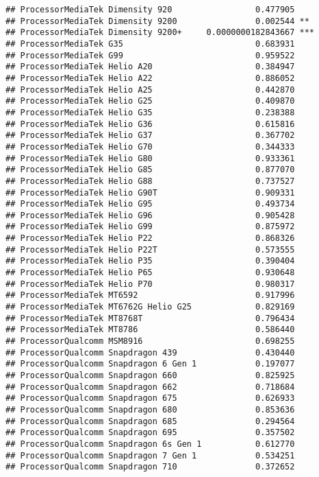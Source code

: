 \documentclass[
]{article}
\begin{document}
\begin{verbatim}
## ProcessorMediaTek Dimensity 920                 0.477905    
## ProcessorMediaTek Dimensity 9200                0.002544 ** 
## ProcessorMediaTek Dimensity 9200+     0.0000000182843667 ***
## ProcessorMediaTek G35                           0.683931    
## ProcessorMediaTek G99                           0.959522    
## ProcessorMediaTek Helio A20                     0.384947    
## ProcessorMediaTek Helio A22                     0.886052    
## ProcessorMediaTek Helio A25                     0.442870    
## ProcessorMediaTek Helio G25                     0.409870    
## ProcessorMediaTek Helio G35                     0.238388    
## ProcessorMediaTek Helio G36                     0.615816    
## ProcessorMediaTek Helio G37                     0.367702    
## ProcessorMediaTek Helio G70                     0.344333    
## ProcessorMediaTek Helio G80                     0.933361    
## ProcessorMediaTek Helio G85                     0.877070    
## ProcessorMediaTek Helio G88                     0.737527    
## ProcessorMediaTek Helio G90T                    0.909331    
## ProcessorMediaTek Helio G95                     0.493734    
## ProcessorMediaTek Helio G96                     0.905428    
## ProcessorMediaTek Helio G99                     0.875972    
## ProcessorMediaTek Helio P22                     0.868326    
## ProcessorMediaTek Helio P22T                    0.573555    
## ProcessorMediaTek Helio P35                     0.390404    
## ProcessorMediaTek Helio P65                     0.930648    
## ProcessorMediaTek Helio P70                     0.980317    
## ProcessorMediaTek MT6592                        0.917996    
## ProcessorMediaTek MT6762G Helio G25             0.829169    
## ProcessorMediaTek MT8768T                       0.796434    
## ProcessorMediaTek MT8786                        0.586440    
## ProcessorQualcomm MSM8916                       0.698255    
## ProcessorQualcomm Snapdragon 439                0.430440    
## ProcessorQualcomm Snapdragon 6 Gen 1            0.197077    
## ProcessorQualcomm Snapdragon 660                0.825925    
## ProcessorQualcomm Snapdragon 662                0.718684    
## ProcessorQualcomm Snapdragon 675                0.626933    
## ProcessorQualcomm Snapdragon 680                0.853636    
## ProcessorQualcomm Snapdragon 685                0.294564    
## ProcessorQualcomm Snapdragon 695                0.357502    
## ProcessorQualcomm Snapdragon 6s Gen 1           0.612770    
## ProcessorQualcomm Snapdragon 7 Gen 1            0.534251    
## ProcessorQualcomm Snapdragon 710                0.372652    

\end{verbatim}
\end{document}
